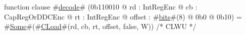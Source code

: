 function clause #\hyperref[sailMIPSzdecode]{decode}# (0b110010 @ rd : IntRegEnc @ cb : CapRegOrDDCEnc @ rt : IntRegEnc @ offset : #\hyperref[sailMIPSzbits]{bits}#(8) @ 0b0 @ 0b10) = #\hyperref[sailMIPSzSome]{Some}#(#\hyperref[sailMIPSzCLoad]{CLoad}#(rd, cb, rt, offset, false, W)) /* CLWU */
